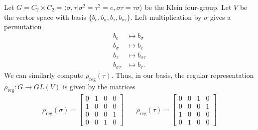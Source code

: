 \begin{frame}[plain]
\begin{example}
Let $G= C_2 \times C_2 = \langle \sigma, \tau | \sigma^2 = \tau^2 = e, \sigma \tau = \tau \sigma \rangle$ be the Klein four-group.  Let $V$ be the vector space with basis $\{ b_e, b_\sigma, b_\tau, b_{\sigma \tau} \}$.  Left multiplication by $\sigma$ gives a permutation 
\begin{align*}
b_e &\mapsto b_\sigma\\
b_\sigma &\mapsto b_e \\
b_ \tau &\mapsto b_{\sigma \tau}\\
b_{\sigma \tau} &\mapsto b_\tau.
\end{align*}
We can similarly compute $\rho_{\text{reg}}(\tau)$.  Thus, in our basis, the regular representation $\rho_{\text{reg}} \colon G \to GL(V)$  is given by the matrices
\begin{align*}
 \rho_{\text{reg}}(\sigma) = \begin{bmatrix}0 & 1 & 0 & 0 \\  1 & 0 & 0 & 0 \\ 0 & 0 & 0 & 1 \\ 0 & 0 & 1 & 0 \end{bmatrix} & \quad \rho_{\text{reg}}(\tau) = \begin{bmatrix}0&0&1&0 \\ 0&0&0&1 \\ 1&0&0&0 \\ 0&1&0&0 \end{bmatrix} \end{align*}
\end{example}
\end{frame}


